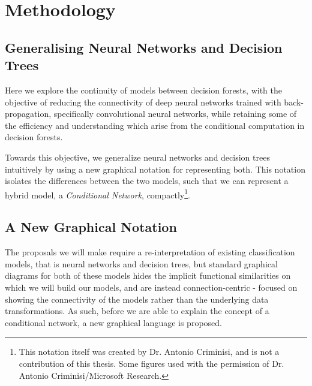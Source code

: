 \documentclass[thesis]{subfiles}
\begin{document}
\chapter{Methodology}
\label{methodology}

\section{Generalising Neural Networks and Decision Trees}
Here we explore the continuity of models between decision forests, with the objective of reducing the connectivity of deep neural networks trained with back-propagation, specifically convolutional neural networks, while retaining some of the efficiency and understanding which arise from the conditional computation in decision forests.

Towards this objective, we generalize neural networks and decision trees intuitively by using a new graphical notation for representing both. This notation isolates the differences between the two models, such that we can represent a hybrid model, \ie a \emph{Conditional Network}, compactly\footnote{This notation itself was created by Dr. Antonio Criminisi, and is not a contribution of this thesis. Some figures used with the permission of Dr. Antonio Criminisi/Microsoft Research.}.

\section{A New Graphical Notation}
The proposals we will make require a re-interpretation of existing classification models, that is neural networks and decision trees, but standard graphical diagrams for both of these models hides the implicit functional similarities on which we will build our models, and are instead connection-centric - focused on showing the connectivity of the models rather than the underlying data transformations. As such, before we are able to explain the concept of a conditional network, a new graphical language is proposed.
\end{document}
